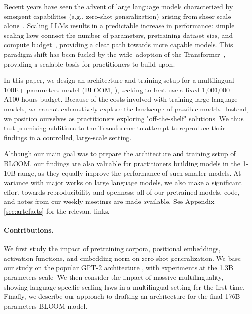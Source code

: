 Recent years have seen the advent of large language models 
characterized by emergent capabilities (e.g., zero-shot generalization) arising from sheer scale alone~\cite{radford2019language,brown2020gpt3}.
Scaling LLMs results in a predictable increase in performance: simple scaling laws connect the number of parameters, pretraining dataset size, and compute budget~\cite{kaplan2020scaling,ganguli2022predictability,hoffmann2022training}, providing a clear path towards more capable models. This paradigm shift has been fueled by the wide~adoption of the Transformer~\cite{vaswani2017attention}, providing a scalable basis for practitioners to build upon. 

In this paper, we design an architecture and training setup for a multilingual 100B+ parameters model (BLOOM, \citet{bigscience_workshop_2022}), seeking to best use a fixed 1,000,000 A100-hours budget. Because of the costs involved with training large language models, we cannot exhaustively explore the landscape of possible models. Instead, we position ourselves as practitioners exploring "off-the-shelf" solutions. We thus test promising additions to the Transformer to attempt to reproduce their findings in a controlled, large-scale setting.

Although our main goal was to prepare the architecture and training setup of BLOOM, our findings are also valuable for practitioners building models in the 1-10B range, as they equally improve the performance of such smaller models. At variance with major works on large language models, we also make a significant effort towards reproducibility and openness: all of our pretrained models, code, and notes from our weekly meetings are made available. See Appendix \ref{sec:artefacts} for the relevant links.

\paragraph{Contributions.} We first study the impact of pretraining corpora, positional embeddings, activation functions, and embedding norm on zero-shot generalization. We base our study on the popular GPT-2 architecture \cite{radford2019language}, with experiments at the 1.3B parameters scale. We then consider the impact of massive multilinguality, showing language-specific scaling laws in a multilingual setting for the first time. Finally, we describe our approach to drafting an architecture for the final 176B parameters BLOOM model.

